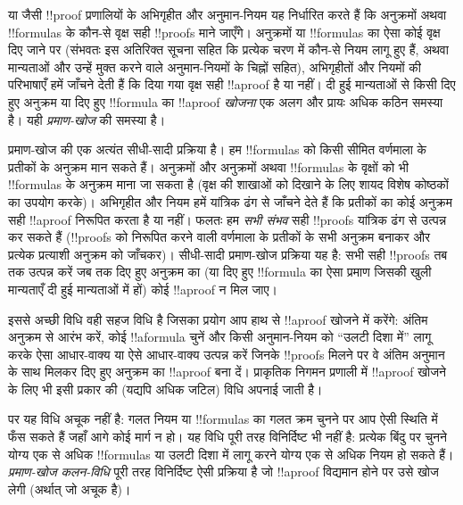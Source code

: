\documentclass[../../../include/open-logic-section]{subfiles}
\begin{document}


 या  जैसी !!{proof} प्रणालियों के अभिगृहीत और अनुमान-नियम
यह निर्धारित करते हैं कि अनुक्रमों अथवा !!{formula}s के कौन-से वृक्ष सही
!!{proof}s माने जाएँगे। अनुक्रमों या !!{formula}s का ऐसा कोई वृक्ष दिए जाने
पर (संभवतः इस अतिरिक्त सूचना सहित कि प्रत्येक चरण में कौन-से नियम लागू हुए
हैं, अथवा मान्यताओं और उन्हें मुक्त करने वाले अनुमान-नियमों के चिह्नों सहित),
अभिगृहीतों और नियमों की परिभाषाएँ हमें जाँचने देती हैं कि दिया गया वृक्ष सही
!!a{proof} है या नहीं। दी हुई मान्यताओं से किसी दिए हुए अनुक्रम या दिए हुए
!!{formula} का !!a{proof} \emph{खोजना} एक अलग और प्रायः अधिक कठिन समस्या है।
यही \emph{प्रमाण-खोज} की समस्या है।

प्रमाण-खोज की एक अत्यंत सीधी-सादी प्रक्रिया है। हम !!{formula}s को किसी सीमित
वर्णमाला के प्रतीकों के अनुक्रम मान सकते हैं। अनुक्रमों और अनुक्रमों अथवा
!!{formula}s के वृक्षों को भी !!{formula}s के अनुक्रम माना जा सकता है (वृक्ष
की शाखाओं को दिखाने के लिए शायद विशेष कोष्ठकों का उपयोग करके)। अभिगृहीत और
नियम हमें यांत्रिक ढंग से जाँचने देते हैं कि प्रतीकों का कोई अनुक्रम सही
!!a{proof} निरूपित करता है या नहीं। फलतः हम \emph{सभी संभव} सही !!{proof}s
यांत्रिक ढंग से उत्पन्न कर सकते हैं (!!{proof}s को निरूपित करने वाली वर्णमाला
के प्रतीकों के सभी अनुक्रम बनाकर और प्रत्येक प्रत्याशी अनुक्रम को जाँचकर)।
सीधी-सादी प्रमाण-खोज प्रक्रिया यह है: सभी सही !!{proof}s तब तक उत्पन्न करें
जब तक दिए हुए अनुक्रम का (या दिए हुए !!{formula} का ऐसा प्रमाण जिसकी खुली
मान्यताएँ दी हुई मान्यताओं में हों) कोई !!a{proof} न मिल जाए।

इससे अच्छी विधि वही सहज विधि है जिसका प्रयोग आप हाथ से !!a{proof} खोजने में
करेंगे: अंतिम अनुक्रम से आरंभ करें, कोई !!a{formula} चुनें और किसी अनुमान-नियम
को ``उलटी दिशा में'' लागू करके ऐसा आधार-वाक्य या ऐसे आधार-वाक्य उत्पन्न करें
जिनके !!{proof}s मिलने पर वे अंतिम अनुमान के साथ मिलकर दिए हुए अनुक्रम का
!!a{proof} बना दें। प्राकृतिक निगमन प्रणाली में !!a{proof} खोजने के लिए भी
इसी प्रकार की (यद्यपि अधिक जटिल) विधि अपनाई जाती है।

पर यह विधि अचूक नहीं है: गलत नियम या !!{formula}s का गलत क्रम चुनने पर आप
ऐसी स्थिति में फँस सकते हैं जहाँ आगे कोई मार्ग न हो। यह विधि पूरी तरह
विनिर्दिष्ट भी नहीं है: प्रत्येक बिंदु पर चुनने योग्य एक से अधिक !!{formula}s
या उलटी दिशा में लागू करने योग्य एक से अधिक नियम हो सकते हैं। \emph{प्रमाण-खोज
कलन-विधि} पूरी तरह विनिर्दिष्ट ऐसी प्रक्रिया है जो !!a{proof} विद्यमान होने पर
उसे खोज लेगी (अर्थात् जो अचूक है)।
\end{document}
